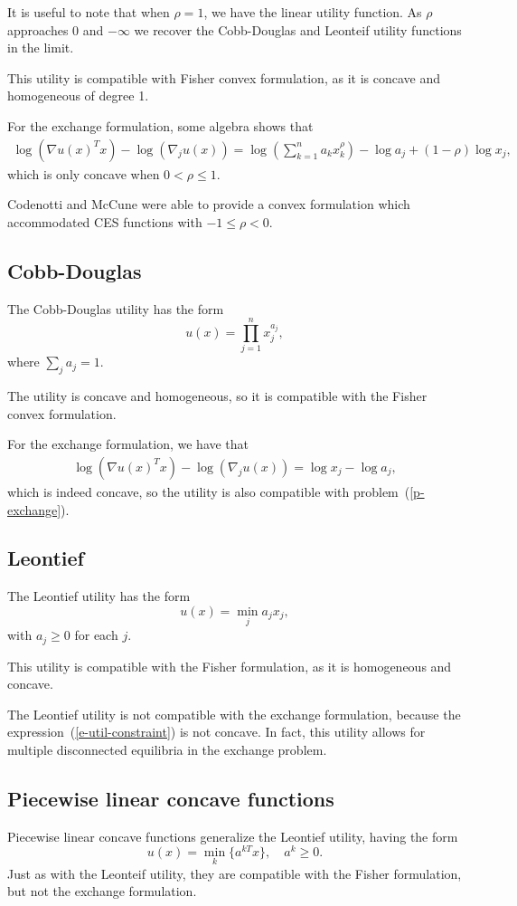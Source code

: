 \documentclass[12pt]{article}
\begin{document}
It is useful to note that when $\rho = 1$, we have the linear utility function. As $\rho$ approaches $0$ and $-\infty$ we recover the Cobb-Douglas and Leonteif
utility functions in the limit. %

This utility is compatible with Fisher convex formulation, as it is concave and homogeneous of degree 1.

For the exchange formulation, some algebra shows that 
\begin{align*}
\log(\nabla u(x)^T x) - \log(\nabla_j u(x)) =
\log\left(\sum_{k=1}^n a_k x_k^\rho \right) - \log a_j + (1-\rho) \log x_j,
\end{align*}
which is only concave when $0 < \rho \leq 1$.

Codenotti and McCune \cite{codenotti2005marketCES} were able to provide a convex formulation which accommodated
CES functions with $-1 \leq \rho < 0$.

\subsection{Cobb-Douglas}
The Cobb-Douglas utility has the form
\[
u(x) = \prod_{j=1}^{n} x_j^{a_j},
\]
where $\sum_j a_j = 1$.


The utility is concave and homogeneous, so it is compatible with the Fisher
convex formulation.

For the exchange formulation, we have that
\begin{align*}
\log(\nabla u(x)^T x) - \log(\nabla_j u(x)) =
\log x_j - \log a_j,
\end{align*}
which is indeed concave, so the utility is also compatible with
problem~(\ref{p-exchange}).

\subsection{Leontief}
The Leontief utility has the form
\[
u(x) = \min_j a_j x_j,
\]
with $a_j \geq 0$ for each $j$. 

This utility is compatible with the Fisher formulation, as it is homogeneous and concave.

The Leontief utility is not compatible with the exchange formulation,
because the expression~(\ref{e-util-constraint}) is not concave.
In fact, this utility allows for multiple disconnected equilibria in the exchange problem. %

\subsection{Piecewise linear concave functions}
Piecewise linear concave functions generalize the Leontief utility, having the form
\[
u(x) = \min_k\lbrace a^{kT}x \rbrace,\quad a^k \geq 0.
\]
Just as with the Leonteif utility, they are compatible with the Fisher
formulation, but not the exchange formulation.
\end{document}
